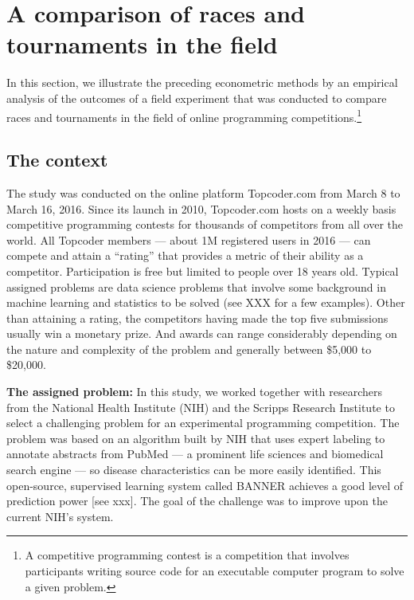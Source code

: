\section{A comparison of races and tournaments in the
field}\label{a-comparison-of-races-and-tournaments-in-the-field}

In this section, we illustrate the preceding econometric methods by an
empirical analysis of the outcomes of a field experiment that was
conducted to compare races and tournaments in the field of online
programming competitions.\footnote{A competitive programming contest is
  a competition that involves participants writing source code for an
  executable computer program to solve a given problem.}

\subsection{The context}\label{the-context}

The study was conducted on the online platform Topcoder.com from March 8
to March 16, 2016. Since its launch in 2010, Topcoder.com hosts on a
weekly basis competitive programming contests for thousands of
competitors from all over the world. All Topcoder members --- about 1M
registered users in 2016 --- can compete and attain a ``rating'' that
provides a metric of their ability as a competitor. Participation is
free but limited to people over 18 years old. Typical assigned problems
are data science problems that involve some background in machine
learning and statistics to be solved (see XXX for a few examples). Other
than attaining a rating, the competitors having made the top five
submissions usually win a monetary prize. And awards can range
considerably depending on the nature and complexity of the problem and
generally between \$5,000 to \$20,000.

\textbf{The assigned problem:} In this study, we worked together with
researchers from the National Health Institute (NIH) and the Scripps
Research Institute to select a challenging problem for an experimental
programming competition. The problem was based on an algorithm built by
NIH that uses expert labeling to annotate abstracts from PubMed --- a
prominent life sciences and biomedical search engine --- so disease
characteristics can be more easily identified. This open-source,
supervised learning system called BANNER achieves a good level of
prediction power {[}see xxx{]}. The goal of the challenge was to improve
upon the current NIH's system.

